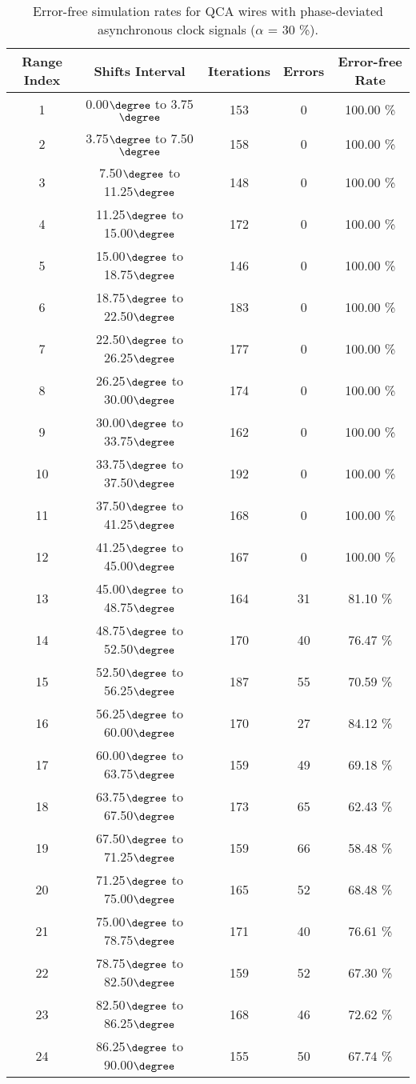 \flushleft
\begin{table}[h]
\begin{center}
\caption{Error-free simulation rates for QCA wires with phase-deviated asynchronous clock signals ($\alpha$ = 30 \%).}
\begin{tabular}{|c|c|c|c|c|}
\hline
\textbf{Range Index} & \textbf{Shifts Interval} & \textbf{Iterations} & \textbf{Errors} & \textbf{Error-free Rate} \\
\hline
1  &  0.00$\degree$ to  3.75$\degree$ & 153 &  0 & 100.00 \% \\
\hline
2  &  3.75$\degree$ to  7.50$\degree$ & 158 &  0 & 100.00 \% \\
\hline
3  &  7.50$\degree$ to 11.25$\degree$ & 148 &  0 & 100.00 \% \\
\hline
4  & 11.25$\degree$ to 15.00$\degree$ & 172 &  0 & 100.00 \% \\
\hline
5  & 15.00$\degree$ to 18.75$\degree$ & 146 &  0 & 100.00 \% \\
\hline
6  & 18.75$\degree$ to 22.50$\degree$ & 183 &  0 & 100.00 \% \\
\hline
7  & 22.50$\degree$ to 26.25$\degree$ & 177 &  0 & 100.00 \% \\
\hline
8  & 26.25$\degree$ to 30.00$\degree$ & 174 &  0 & 100.00 \% \\
\hline
9  & 30.00$\degree$ to 33.75$\degree$ & 162 &  0 & 100.00 \% \\
\hline
10 & 33.75$\degree$ to 37.50$\degree$ & 192 &  0 & 100.00 \% \\
\hline
11 & 37.50$\degree$ to 41.25$\degree$ & 168 &  0 & 100.00 \% \\
\hline
12 & 41.25$\degree$ to 45.00$\degree$ & 167 &  0 & 100.00 \% \\
\hline
13 & 45.00$\degree$ to 48.75$\degree$ & 164 & 31 &  81.10 \% \\
\hline
14 & 48.75$\degree$ to 52.50$\degree$ & 170 & 40 &  76.47 \% \\
\hline
15 & 52.50$\degree$ to 56.25$\degree$ & 187 & 55 &  70.59 \% \\
\hline
16 & 56.25$\degree$ to 60.00$\degree$ & 170 & 27 &  84.12 \% \\
\hline
17 & 60.00$\degree$ to 63.75$\degree$ & 159 & 49 &  69.18 \% \\
\hline
18 & 63.75$\degree$ to 67.50$\degree$ & 173 & 65 &  62.43 \% \\
\hline
19 & 67.50$\degree$ to 71.25$\degree$ & 159 & 66 &  58.48 \% \\
\hline
20 & 71.25$\degree$ to 75.00$\degree$ & 165 & 52 &  68.48 \% \\
\hline
21 & 75.00$\degree$ to 78.75$\degree$ & 171 & 40 &  76.61 \% \\
\hline
22 & 78.75$\degree$ to 82.50$\degree$ & 159 & 52 &  67.30 \% \\
\hline
23 & 82.50$\degree$ to 86.25$\degree$ & 168 & 46 &  72.62 \% \\
\hline
24 & 86.25$\degree$ to 90.00$\degree$ & 155 & 50 &  67.74 \% \\
\hline


\end{tabular}
\end{center}
\end{table}
